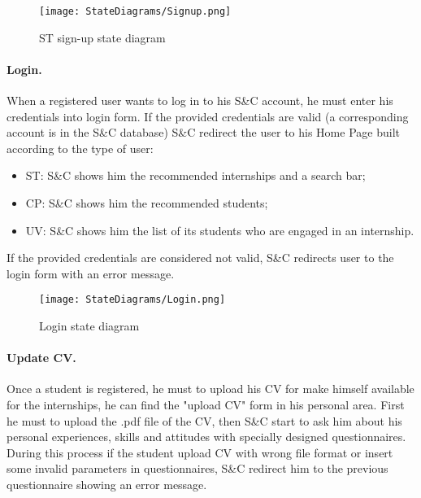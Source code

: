 \begin{figure}[H]
    \begin{center}
        \texttt{[image: StateDiagrams/Signup.png]}
        \caption{ST sign-up state diagram}
        \label{fig:signup_sd}%
    \end{center}
\end{figure}

\paragraph{Login.}
When a registered user wants to log in to his S\&C account, he must enter his credentials into login form.
If the provided credentials are valid (a corresponding account is in the S\&C database) S\&C redirect the user to his Home Page built according to the type of user:
\begin{itemize}
    \item ST: S\&C shows him the recommended internships and a search bar;
    \item CP: S\&C shows him the recommended students;
    \item UV: S\&C shows him the list of its students who are engaged in an internship.
\end{itemize}
If the provided credentials are considered not valid, S\&C redirects user to the login form with an error message.

\begin{figure}[H]
    \begin{center}
        \texttt{[image: StateDiagrams/Login.png]}
        \caption{Login state diagram}
        \label{fig:login_sd}%
    \end{center}
\end{figure}

\paragraph{Update CV.}
Once a student is registered, he must to upload his CV for make himself available for the internships, he can find the "upload CV" form in his personal area.
First he must to upload the .pdf file of the CV, then S\&C start to ask him about his personal experiences, skills and attitudes with specially designed questionnaires.
During this process if the student upload CV with wrong file format or insert some invalid parameters in questionnaires, S\&C redirect him to the previous questionnaire showing an error message. 

